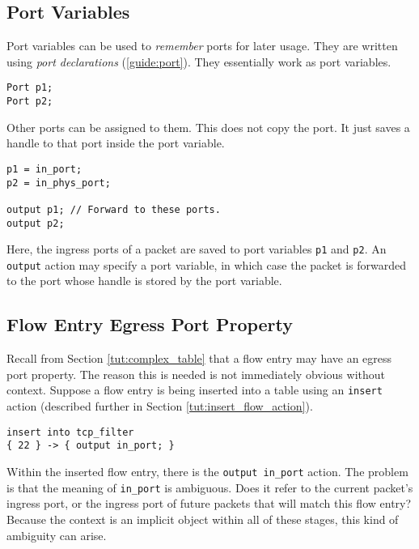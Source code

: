 \subsection{Port Variables} \label{tut:declared_ports}

Port variables can be used to \textit{remember} ports for later usage. They are
written using \textit{port declarations} (\ref{guide:port}).
They essentially work as port variables.

\begin{codepage}
\begin{lstlisting}
Port p1;
Port p2;
\end{lstlisting}
\end{codepage}

Other ports can be assigned to them. This does not copy the port. It just saves
a handle to that port inside the port variable.

\begin{codepage}
\begin{lstlisting}
p1 = in_port; 
p2 = in_phys_port;

output p1; // Forward to these ports.
output p2;
\end{lstlisting}
\end{codepage}

Here, the ingress ports of a packet are saved to port variables \texttt{p1} and \texttt{p2}. An \texttt{output} action may specify a port variable, in which case the packet is forwarded to the port whose handle is stored by the port variable.

\subsection{Flow Entry Egress Port Property}

Recall from Section \ref{tut:complex_table} that a flow entry may
have an egress port property.
The reason this is needed is not immediately obvious without context.
Suppose a flow entry is being inserted into a table using an
\texttt{insert} action (described further in Section \ref{tut:insert_flow_action}).

\begin{codepage}
\begin{lstlisting}
insert into tcp_filter
{ 22 } -> { output in_port; }
\end{lstlisting}
\end{codepage}

Within the inserted flow entry, there is the \texttt{output in\_port} action.
The problem is that the meaning of \texttt{in\_port} is ambiguous. 
Does it refer to the current packet's ingress port, or the ingress port of
future packets that will match this flow entry? Because the context is
an implicit object within all of these stages, this kind of ambiguity can
arise.

